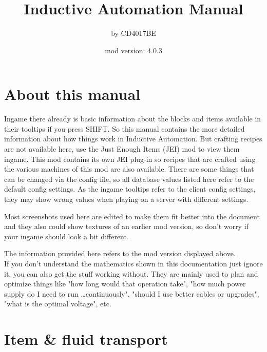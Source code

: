 \documentclass[11pt]{article} %
\title{Inductive Automation Manual}
\author{by CD4017BE}
\date{mod version: 4.0.3}
\begin{document}
 \maketitle
 \tableofcontents
 
 \section{About this manual}  
  Ingame there already is basic information about the blocks and items available in their tooltips if you press SHIFT. So this manual contains the more detailed information about how things work in Inductive Automation. But crafting recipes are not available here, use the Just Enough Items (JEI) mod to view them ingame. This mod contains its own JEI plug-in so recipes that are crafted using the various machines of this mod are also available. There are some things that can be changed via the config file, so all database values listed here refer to the default config settings. As the ingame tooltips refer to the client config settings, they may show wrong values when playing on a server with different settings.

Most screenshots used here are edited to make them fit better into the document and they also could show textures of an earlier mod version, so don't worry if your ingame should look a bit different. 

The information provided here refers to the mod version displayed above.
\\
If you don't understand the mathematics shown in this documentation just ignore it, you can also get the stuff working without. They are mainly used to plan and optimize things like "how long would that operation take", "how much power supply do I need to run \dots continuously", "should I use better cables or upgrades", "what is the optimal voltage", etc.

\newpage
\section{Item \& fluid transport}
\end{document}

